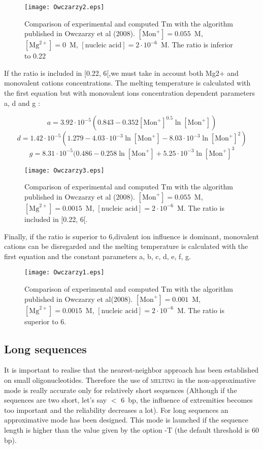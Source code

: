 \documentclass{article}
\begin{document}
\begin{figure}[H]
\texttt{[image: Owczarzy2.eps]}
\caption{Comparison of experimental and computed Tm with the algorithm published
in Owczarzy et al (2008). $[\mbox{Mon}^+] = 0.055$~M, $[\mbox{Mg}^{2+}] = 0$~M, $[\mbox{nucleic acid}] =
2\cdot{}10^{-6}$~M. The ratio is inferior to 0.22}
\end{figure}


If the ratio is included in [0.22, 6[,we must take in account both Mg2+ and monovalent cations 
concentrations. The melting temperature is calculated with the first equation but with monovalent 
ions concentration dependent parameters a, d and g :

\begin{displaymath}
a = 3.92\cdot{}10^{-5} (0.843 - 0.352 [\mbox{Mon}^+]^{0.5} \ln [\mbox{Mon}^+]) 
\end{displaymath}
\begin{displaymath}
d = 1.42\cdot{}10^{-5} (1.279 - 4.03\cdot{}10^{-3} \ln [\mbox{Mon}^+] -
8.03\cdot{}10^{-3} \ln [\mbox{Mon}^+]^{2})
\end{displaymath}
\begin{displaymath}
g = 8.31\cdot{}10^{-5} (0.486 - 0.258 \ln [\mbox{Mon}^+] + 5.25\cdot{}10^{-3}
\ln [\mbox{Mon}^+]^{3} 
\end{displaymath}

\begin{figure}[H]
\texttt{[image: Owczarzy3.eps]}
\caption{Comparison of experimental and computed Tm with the algorithm published
in Owczarzy et al (2008). $[\mbox{Mon}^+] = 0.055$~M, $[\mbox{Mg}^{2+}] = 0.0015$~M, $[\mbox{nucleic acid}] =
2\cdot{}10^{-6}$~M. The ratio is included in [0.22, 6[.}
\end{figure}

Finally, if the ratio is superior to 6,divalent ion influence is dominant, monovalent cations can be 
disregarded and the melting temperature is calculated with the first equation and the constant parameters a, b, c, d,
e, f, g.

\begin{figure}[H]
\texttt{[image: Owczarzy1.eps]}
\caption{Comparison of experimental and computed Tm with the algorithm published
in Owczarzy et al(2008). $[\mbox{Mon}^+] = 0.001$~M, $[\mbox{Mg}^{2+}] = 0.0015$~M, $[\mbox{nucleic acid}] =
2\cdot{}10^{-6}$~M. The ratio is superior to 6.}
\end{figure}
    
\subsection{Long sequences }  
  It is important to realise that the nearest-neighbor approach 
has been established  on small oligonucleotides. Therefore the use of \textsc{melting} 
in the non-approximative  mode is really accurate only for relatively short 
sequences (Although if the sequences are two short, let's say $<$ 6~bp, the 
influence of extremities becomes too important and the  reliability decreases 
a lot). For long sequences an approximative mode has been designed. This mode is 
launched if the sequence length is higher than the value 
given by the option -T (the default threshold is 60 bp).
 
\end{document}
